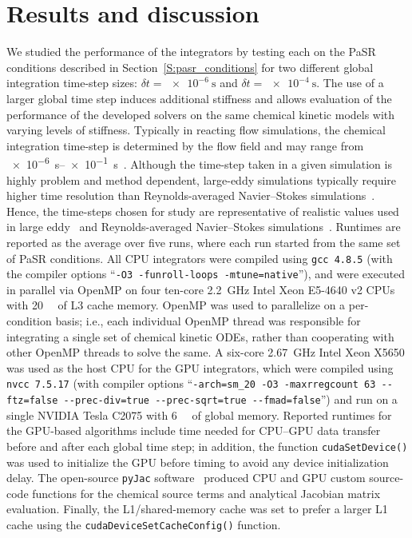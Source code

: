\documentclass[preprint]{elsarticle}
\begin{document}
\section{Results and discussion}
\label{S:results}

We studied the performance of the integrators by testing each on the PaSR conditions described in Section~\ref{S:pasr_conditions} for two different global integration time-step sizes: $\delta t = \SI{e-6}{\s}$ and $\delta t = \SI{e-4}{\s}$.
The use of a larger global time step induces additional stiffness and allows evaluation of the performance of the developed solvers on the same chemical kinetic models with varying levels of stiffness.
Typically in reacting flow simulations, the chemical integration time-step is determined by the flow field and may range from \SIrange{e-6}{e-1}{\s}~\cite{Yang:2013ip}.
Although the time-step taken in a given simulation is highly problem and method dependent, large-eddy simulations typically require higher time resolution than Reynolds-averaged Navier--Stokes simulations~\cite{Iaccarino:2003147}.
Hence, the time-steps chosen for study are representative of realistic values used in large eddy~\cite{Wang20111319,Bulat20133155} and Reynolds-averaged Navier--Stokes simulations~\cite{Ramirez2010,Galloni20091131}.
Runtimes are reported as the average over five runs, where each run started from the same set of PaSR conditions.
All CPU integrators were compiled using \texttt{gcc 4.8.5} (with the compiler options ``\texttt{-O3 -funroll-loops -mtune=native}''), and were executed in parallel via OpenMP on four ten-core \SI{2.2}{\giga\hertz} Intel Xeon E5-4640 v2 CPUs with \SI{20}{\mega\byte} of L3 cache memory.
OpenMP was used to parallelize on a per-condition basis; i.e., each individual OpenMP thread was responsible for integrating a single set of chemical kinetic ODEs, rather than cooperating with other OpenMP threads to solve the same.
A six-core \SI{2.67}{\giga\hertz} Intel Xeon X5650 was used as the host CPU for the GPU integrators, which were compiled using \texttt{nvcc 7.5.17} (with compiler options ``\texttt{-arch=sm\_20 -O3 -maxrregcount 63 -{}-ftz=false -{}-prec-div=true -{}-prec-sqrt=true -{}-fmad=false}'') and run on a single NVIDIA Tesla C2075 with \SI{6}{\giga\byte} of global memory.
Reported runtimes for the GPU-based algorithms include time needed for CPU--GPU data transfer before and after each global time step; in addition, the function \texttt{cudaSetDevice()} was used to initialize the GPU before timing to avoid any device initialization delay.
The open-source \texttt{pyJac} software~\cite{niemeyer_2016_51139,Niemeyer:2015ws,Niemeyer:2016aa} produced CPU and GPU custom source-code functions for the chemical source terms and analytical Jacobian matrix evaluation.
Finally, the L1\slash shared-memory cache was set to prefer a larger L1 cache using the \texttt{cudaDeviceSetCacheConfig()} function.
\end{document}
